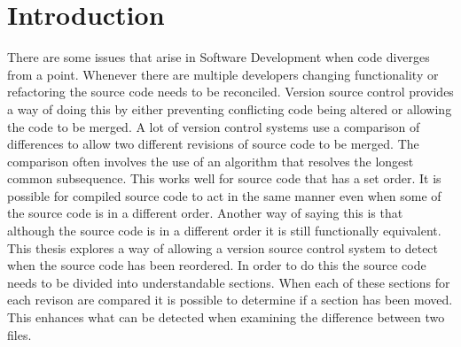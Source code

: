 
\chapter{Introduction}\label{C:intro}


There are some issues that arise in Software Development when code diverges from a point. Whenever there are multiple developers changing functionality or refactoring the source code needs to be reconciled. Version source control provides a way of doing this by either preventing conflicting code being altered or allowing the code to be merged.  A lot of version control systems use a comparison of differences to allow two different revisions of source code to be merged.  The comparison often involves the use of an algorithm that resolves the longest common subsequence.  This works well for source code that has a set order. It is possible for compiled source code to act in the same manner even when some of the source code is in a different order.  Another way of saying this is that although the source code is in a different order it is still functionally equivalent.  This thesis explores a way of allowing a version source control system to detect when the source code has been reordered.  In order to do this the source code needs to be divided into understandable sections.  When each of these sections for each revison are compared it is possible to determine if a section has been moved.  This enhances what can be detected when examining the difference between two files.  
